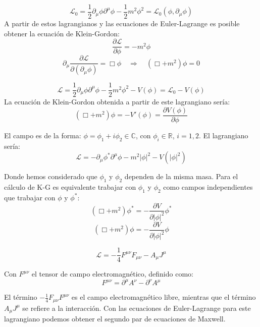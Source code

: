 \begin{example}
  $$
  \mathcal{L}_0 = \frac{1}{2} \partial_\mu \phi \partial^\mu \phi - \frac{1}{2} m^2 \phi^2 = \mathcal{L}_0 (\phi, \partial_\mu \phi)
  $$
  A partir de estos lagrangianos y las ecuaciones de Euler-Lagrange es posible obtener la ecuación de Klein-Gordon:
  $$
  \frac{\partial \mathcal{L}}{\partial \phi} = -m^2 \phi
  $$
  $$
  \partial_\mu \frac{\partial \mathcal{L}}{\partial (\partial_\mu \phi)} = \Box \phi \quad \Rightarrow \quad (\Box + m^2) \phi = 0
  $$

\end{example}
\begin{example}

  $$
    \mathcal{L} = \frac{1}{2} \partial_\mu \phi \partial^\mu \phi - \frac{1}{2} m^2 \phi^2 - V(\phi) = \mathcal{L}_0 - V(\phi)
    $$
    La ecuación de Klein-Gordon obtenida a partir de este lagrangiano sería:
    $$
    (\Box + m^2) \phi = -V'(\phi) = \frac{\partial V(\phi)}{\partial \phi}
    $$
  
\end{example}
\begin{example}
  El campo es de la forma: $\phi = \phi_1 + i \phi_2 \in \mathbb{C}$, con $\phi_i \in \mathbb{R}$, $i = 1, 2$. El lagrangiano sería:
  $$
  \mathcal{L} = -\partial_\mu \phi^* \partial^\mu \phi - m^2 |\phi|^2 - V(|\phi|^2)
  $$

  Donde hemos considerado que $\phi_1$ y $\phi_2$ dependen de la misma masa. Para el cálculo de K-G es equivalente trabajar con $\phi_1$ y $\phi_2$ como campos independientes que trabajar con $\phi$ y $\phi^*$:
  $$
  (\Box + m^2) \phi^* = -\frac{\partial V}{\partial |\phi|^2} \phi^*
  $$
  $$
  (\Box + m^2) \phi = -\frac{\partial V}{\partial |\phi|^2} \phi
  $$
\end{example}
\begin{example}
  $$
    \mathcal{L} = -\frac{1}{4} F^{\mu\nu} F_{\mu\nu} - A_\mu J^\mu
    $$

    Con $F^{\mu\nu}$ el tensor de campo electromagnético, definido como:
    $$
    F^{\mu\nu} = \partial^\mu A^\nu - \partial^\nu A^\mu
    $$

    El término $-\frac{1}{4} F_{\mu\nu} F^{\mu\nu}$ es el campo electromagnético libre, mientras que el término $A_\mu J^\mu$ se refiere a la interacción. Con las ecuaciones de Euler-Lagrange para este lagrangiano podemos obtener el segundo par de ecuaciones de Maxwell.
\end{example}
